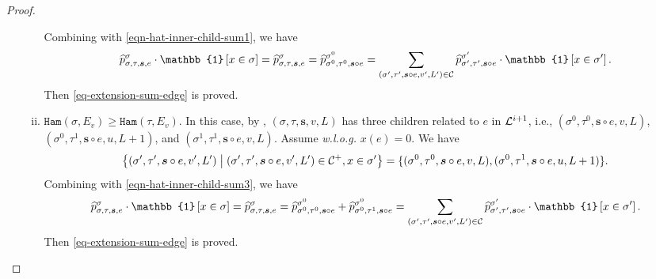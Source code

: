 \documentclass[11pt]{article}
\renewcommand{\mid}{\;\middle\vert\;} \newcommand{\cmid}{\,:\,}
\newcommand{\id}[1]{\mathbb{1}\left[#1\right]}
\def\!#1{\mathtt{#1}}
\newcommand{\seqS}{\boldsymbol{s}}
\begin{document}
\begin{proof}
\begin{itemize}
\begin{enumerate}[(i)]
            Combining with \eqref{eqn-hat-inner-child-sum1}, we have 
             \begin{align*}
            \widehat{p}^{\sigma}_{\sigma,\tau,\seqS,e}\cdot \id{x \in \sigma} = \widehat{p}^{\sigma}_{\sigma,\tau,\seqS,e}=\widehat{p}^{\sigma^0}_{\sigma^0,\tau^0, \seqS \circ e} = \sum_{(\sigma',\tau', \seqS\circ e,v',L')\in \+C} \widehat{p}^{\sigma'}_{\sigma',\tau',\seqS\circ e}\cdot \id{ x\in \sigma'}. 
            \end{align*}
            Then \eqref{eq-extension-sum-edge} is proved. \item ${\!{Ham}\left(\sigma,{E_v}\right)}\geq{\!{Ham}\left(\tau,{E_v}\right)}$. In this case, by ,  $(\sigma,\tau,\seqS,v,L)$ has three children related to $e$ in $\mathcal{L}^{i+1}$, i.e., $(\sigma^0, \tau^0, \seqS \circ e,v,L)$, $(\sigma^0, \tau^1, \seqS \circ e, u, L + 1)$, and $(\sigma^1, \tau^1, \seqS\circ e,v,L)$. Assume \emph{w.l.o.g.} $x(e) = 0$.
            We have 
            \[\left\{(\sigma',\tau', \seqS\circ e,v',L')\mid (\sigma',\tau', \seqS\circ e,v',L')\in \+C^{+},x\in \sigma'\right\} = \{ (\sigma^0, \tau^0, \seqS \circ e, v, L),(\sigma^0, \tau^1, \seqS \circ e, u, L+1)\}.\]          
            Combining with \eqref{eqn-hat-inner-child-sum3}, we have 
             \begin{align*}
            \widehat{p}^{\sigma}_{\sigma,\tau,\seqS,e}\cdot \id{x \in \sigma} = \widehat{p}^{\sigma}_{\sigma,\tau,\seqS,e}=\widehat{p}^{\sigma^0}_{\sigma^0,\tau^0, \seqS \circ e} +\widehat{p}^{\sigma^0}_{\sigma^0,\tau^1, \seqS \circ e} = \sum_{(\sigma',\tau', \seqS\circ e,v',L')\in \+C} \widehat{p}^{\sigma'}_{\sigma',\tau',\seqS\circ e}\cdot \id{ x\in \sigma'}.  
            \end{align*}
            Then \eqref{eq-extension-sum-edge} is proved.
        \end{enumerate} 
    \end{itemize}
  
    

    
  

   
    


\end{proof}
\end{document}
